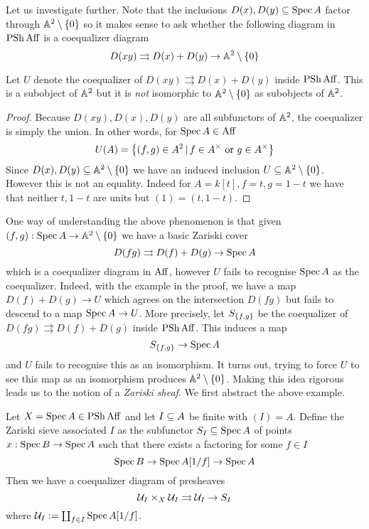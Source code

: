 \documentclass[./main.tex]{subfiles}
\begin{document}
Let us investigate further.
Note that the inclusions $D(x) , D(y) \subseteq \operatorname{Spec} A$
factor through $\mathbb{A}^2\setminus\left\{0\right\}$
so it makes sense to ask whether the following diagram
in $\operatorname{PSh} \mathrm{Aff}$ is a coequalizer diagram
\[
  D(x y) \rightrightarrows D(x) + D(y) \to \mathbb{A}^2 \setminus \left\{0\right\}
\]
\begin{prop}
  
  Let $U$ denote the coequalizer of $D(x y) \rightrightarrows D(x) + D(y)$
  inside $\operatorname{PSh} \mathrm{Aff}$.
  This is a subobject of $\mathbb{A}^2$ but it is \emph{not}
  isomorphic to $\mathbb{A}^2\setminus\left\{0\right\}$ as subobjects of $\mathbb{A}^2$.
\end{prop}
\begin{proof}
  Because $D(xy) , D(x) , D(y)$ are all subfunctors of $\mathbb{A}^2$,
  the coequalizer is simply the union.
  In other words, for $\operatorname{Spec} A \in \mathrm{Aff}$ 
  \[
    U(A) = \left\{(f , g) \in A^2 \,|\, f \in A^\times \text{ or } g \in A^\times\right\}
  \]
  Since $D(x) , D(y) \subseteq \mathbb{A}^2\setminus\left\{0\right\}$
  we have an induced inclusion $U \subseteq \mathbb{A}^2\setminus\left\{0\right\}$.
  However this is not an equality.
  Indeed for $A = k[t] , f = t , g = 1 - t$
  we have that neither $t , 1 - t$ are units but
  $(1) = (t , 1 - t)$.
\end{proof}
One way of understanding the above phenomenon is that
given $(f , g) : \operatorname{Spec} A \to \mathbb{A}^2\setminus\left\{0\right\}$ we have 
a basic Zariski cover
\[
  D(f g) \rightrightarrows D(f) + D(g) \to \operatorname{Spec} A  
\]
which is a coequalizer diagram in $\mathrm{Aff}$,
however $U$ fails to recognise $\operatorname{Spec} A$ as the coequalizer.
Indeed, with the example in the proof,
we have a map $D(f) + D(g) \to U$ which agrees on the
intersection $D(fg)$ but fails to descend 
to a map $\operatorname{Spec} A \to U$.
More precisely, let $S_{\left\{f , g\right\}}$ be the coequalizer
of $D(f g) \rightrightarrows D(f) + D(g)$ inside $\operatorname{PSh} \mathrm{Aff}$.
This induces a map
\[
  S_{\left\{f , g\right\}} \to \operatorname{Spec} A  
\]
and $U$ fails to recognise this as an isomorphism.
It turns out,
trying to force $U$ to see this map as an isomorphism produces $\mathbb{A}^2\setminus\left\{0\right\}$.
Making this idea rigorous leads us to the notion of a \emph{Zariski sheaf}.
We first abstract the above example.
\begin{prop}
  
  Let $X = \operatorname{Spec} A \in \operatorname{PSh} \mathrm{Aff}$
  and let $I \subseteq A$ be finite with $(I) = A$.
  Define the Zariski sieve associated $I$ as
  the subfunctor $S_I \subseteq \operatorname{Spec} A$
  of points $x : \operatorname{Spec} B \to \operatorname{Spec} A$
  such that there exists a factoring for some $f \in I$
  \[
    \operatorname{Spec} B \to \operatorname{Spec} A[1 / f] \to \operatorname{Spec} A
  \]
  Then we have a coequalizer diagram of presheaves
  \[
    \mathcal{U}_I \times_X \mathcal{U}_I \rightrightarrows \mathcal{U}_I \to S_I
  \]
  where $\mathcal{U}_I := \coprod_{f \in I} \operatorname{Spec} A[1 / f]$.
\end{prop}
\end{document}
